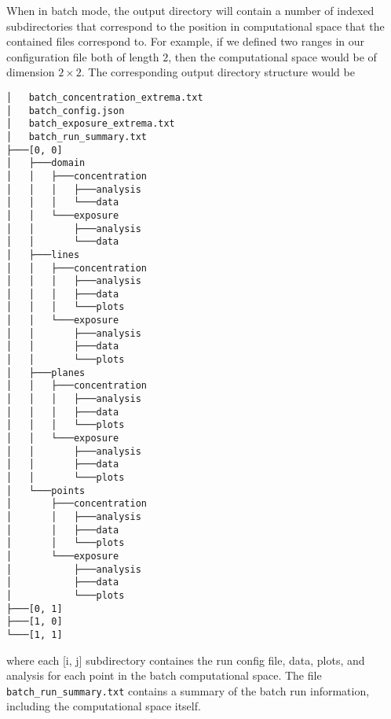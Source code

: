 \documentclass[]{article}
\def\code#1{\texttt{#1}}
\begin{document}
\noindent When in batch mode, the output directory will contain a number of indexed
subdirectories that correspond to the position in computational space that the
contained files correspond to. For example, if we defined two ranges in our
configuration file both of length $2$, then the computational space would be of
dimension $2\times2$. The corresponding output directory structure would be
\begin{verbatim}
│   batch_concentration_extrema.txt
│   batch_config.json
│   batch_exposure_extrema.txt
│   batch_run_summary.txt
├───[0, 0]
│   ├───domain
│   │   ├───concentration
│   │   │   ├───analysis
│   │   │   └───data
│   │   └───exposure
│   │       ├───analysis
│   │       └───data
│   ├───lines
│   │   ├───concentration
│   │   │   ├───analysis
│   │   │   ├───data
│   │   │   └───plots
│   │   └───exposure
│   │       ├───analysis
│   │       ├───data
│   │       └───plots
│   ├───planes
│   │   ├───concentration
│   │   │   ├───analysis
│   │   │   ├───data
│   │   │   └───plots
│   │   └───exposure
│   │       ├───analysis
│   │       ├───data
│   │       └───plots
│   └───points
│       ├───concentration
│       │   ├───analysis
│       │   ├───data
│       │   └───plots
│       └───exposure
│           ├───analysis
│           ├───data
│           └───plots
├───[0, 1]
├───[1, 0]
└───[1, 1]
\end{verbatim}
where each [i, j] subdirectory containes the run config file, data, plots, and
analysis for each point in the batch computational space. The file
\code{batch\_run\_summary.txt} contains a summary of the batch run information,
including the computational space itself.
\end{document}
